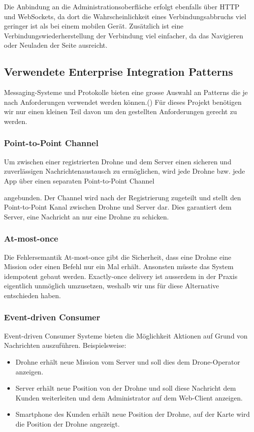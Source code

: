 {{Die Anbindung an die Administrationsoberfläche erfolgt ebenfalls über HTTP und WebSockets, da dort die Wahrscheinlichkeit eines Verbindungsabbruchs viel geringer ist als bei einem mobilen Gerät. Zusätzlich ist eine Verbindungswiederherstellung der Verbindung viel einfacher, da das Navigieren oder Neuladen der Seite ausreicht. \\


\subsection{Verwendete Enterprise Integration Patterns}
Messaging-Systeme und Protokolle bieten eine grosse Auswahl an Patterns die je nach Anforderungen verwendet werden können.({\cite{EIP}}) Für dieses Projekt benötigen wir nur einen kleinen Teil davon um den gestellten Anforderungen gerecht zu werden.
%
\subsubsection{Point-to-Point Channel}
Um zwischen einer registrierten Drohne und dem Server einen sicheren und zuverlässigen Nachrichtenaustausch zu ermöglichen, wird jede Drohne bzw. jede App über einen separaten Point-to-Point Channel	\cite[S. 103]{EIP}} angebunden. Der Channel wird nach der Registrierung zugeteilt und stellt den Point-to-Point Kanal zwischen Drohne und Server dar. Dies garantiert dem Server, eine Nachricht an nur eine Drohne zu schicken.
%
\subsubsection{At-most-once}

Die Fehlersemantik At-most-once gibt die Sicherheit, dass eine Drohne eine Mission oder einen Befehl nur ein Mal erhält. Ansonsten müsste das System idempotent gebaut werden. Exactly-once delivery ist ausserdem in der Praxis eigentlich unmöglich umzusetzen, weshalb wir uns für diese Alternative entschieden haben. 
%
\subsubsection{Event-driven Consumer}
{Event-driven Consumer \cite[S. 442]{EIP}} Systeme bieten die Möglichkeit Aktionen auf Grund von Nachrichten auszuführen. Beispielsweise:
%
\begin{itemize}
	\item Drohne erhält neue Mission vom Server und soll dies dem Drone-Operator anzeigen.
	\item Server erhält neue Position von der Drohne und soll diese Nachricht dem Kunden weiterleiten und dem Administrator auf dem Web-Client anzeigen.
	\item Smartphone des Kunden erhält neue Position der Drohne, auf der Karte wird die Position der Drohne angezeigt.
\end{itemize}

}
